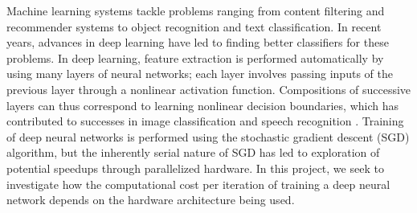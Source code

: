 Machine learning systems tackle problems ranging from content filtering and recommender systems to object recognition and text classification.  In recent years, advances in deep learning have led to finding better classifiers for these problems.  In deep learning, feature extraction is performed automatically by using many layers of neural networks; each layer involves passing inputs of the previous layer through a nonlinear activation function.  Compositions of successive layers can thus correspond to learning nonlinear decision boundaries, which has contributed to successes in image classification  and speech recognition \cite{deeplearning}.  Training of deep neural networks is performed using the stochastic gradient descent (SGD) algorithm, but the inherently serial nature of SGD has led to exploration of potential speedups through parallelized hardware.  In this project, we seek to investigate how the computational cost per iteration of training a deep neural network depends on the hardware architecture being used. 
